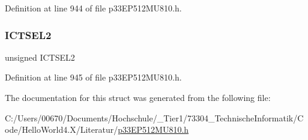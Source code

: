 Definition at line 944 of file p33\+E\+P512\+M\+U810.\+h.

\mbox{\label{structtag_i_c8_c_o_n1_b_i_t_s_a47d80892d449e6edbd5ba2ba9ff06deb}} 
\subsubsection{\texorpdfstring{I\+C\+T\+S\+E\+L2}{ICTSEL2}}
{\footnotesize\ttfamily unsigned I\+C\+T\+S\+E\+L2}



Definition at line 945 of file p33\+E\+P512\+M\+U810.\+h.



The documentation for this struct was generated from the following file\+:\begin{DoxyCompactItemize}
\item 
C\+:/\+Users/00670/\+Documents/\+Hochschule/\+\_\+\+Tier1/73304\+\_\+\+Technische\+Informatik/\+Code/\+Hello\+World4.\+X/\+Literatur/\hyperlink{p33_e_p512_m_u810_8h}{p33\+E\+P512\+M\+U810.\+h}\end{DoxyCompactItemize}
